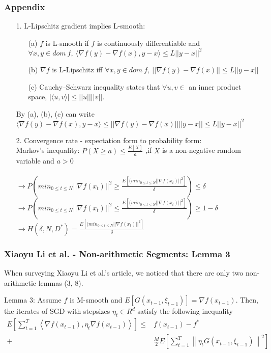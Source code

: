 \documentclass{beamer}
\begin{document}
\begin{frame}
\frametitle{Appendix}
\begin{enumerate} 
    \item [1.] L-Lipschitz gradient implies L-smooth:\\
    \begin{enumerate}
        \item [(a)] $f$ is L-smooth if $f$ is continuously differentiable and $\forall x, y \in dom\ f,\ \langle \nabla f(y) - \nabla f(x), y - x \rangle \leq  L||y - x||^2$
        \item [(b)] $\nabla f$ is L-Lipschitz iff $\forall x, y \in dom\ f,\ ||\nabla f(y)-\nabla f(x)|| \leq L||y-x||$
        \item [(c)] Cauchy–Schwarz inequality states that $\forall u, v \in$ an inner product space, $|\langle u, v \rangle| \leq ||u||||v||$.
    \end{enumerate}
    By (a), (b), (c) can write\\ $\langle \nabla f(y) - \nabla f(x), y - x \rangle \leq ||\nabla f(y) - \nabla f(x)||||y - x|| \leq L ||y - x||^2$
    
    

    \item [2.] Convergence rate - expectation form to probability form:\\
    Markov's inequality: 
    $P(X\geq a)\leq \frac{E[X]}{a}$ ,if $X$ is a non-negative random variable and $a > 0$\\\\
    $\rightarrow P(min_{0\leq t \leq N} ||\nabla f(x_t)||^2 \geq \frac{E[(min_{0\leq t \leq N} ||\nabla f(x_t)||^2]}{\delta}) \leq \delta$\\
    $\rightarrow P(min_{0\leq t \leq N} ||\nabla f(x_t)||^2 \leq \frac{E[(min_{0\leq t \leq N} ||\nabla f(x_t)||^2]}{\delta}) \geq 1-\delta$\\
    $\rightarrow H(\delta, N, D^*)=\frac{E[(min_{0\leq t \leq N} ||\nabla f(x_t)||^2]}{\delta}$
    
\end{enumerate}
\end{frame}

\begin{frame}
\frametitle{Xiaoyu Li et al. - Non-arithmetic Segments: Lemma 3}
When surveying Xiaoyu Li et al.'s article, we noticed that there are only two non-arithmetic lemmas (3, 8).\par
\vspace{5mm}
Lemma 3: Assume $f$ is M-smooth and $E[G(x_{t-1},\xi_{t-1})]=\nabla f(x_{t-1})$. 
Then, the iterates of SGD with stepsizes $\eta_t \in R^{d}$ satisfy the following inequality
$\begin{aligned} E\left[\sum_{t=1}^T\left\langle\nabla f\left(x_{t-1}\right), \eta_t \nabla f\left(x_{t-1}\right)\right\rangle\right] \leq & f\left(x_{t-1}\right)-f^* \\  +\ &\frac{M}{2} E\left[\sum_{t=1}^T\left\|\eta_t G\left(x_{t-1}, \xi_{t-1}\right)\right\|^2\right]\end{aligned}$
\end{frame}
\end{document}
